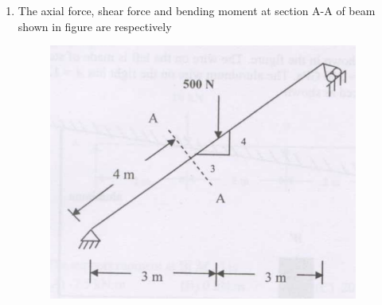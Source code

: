 \documentclass[12pt]{article}
\begin{document}
\begin{enumerate}
\begin{enumerate}

    \item  $F_{AB} = 12\ \mathrm{kN}(\mathrm{T}),\ F_{CD} = 12\ \mathrm{kN}(\mathrm{C}),\ F_{AD} = 9\ \mathrm{kN}(\mathrm{T}),\ F_{BC} = 9\ \mathrm{kN}(\mathrm{T}),\ F_{AC} = 0$  

    \item  $F_{BC} = 0,\ F_{AC} = 15\ \mathrm{kN}(\mathrm{T}),\ F_{CD} = 12\ \mathrm{kN}(\mathrm{C}),\ F_{AD} = 9\ \mathrm{kN}(\mathrm{T}),\ F_{AB} = 12\ \mathrm{kN}(\mathrm{T})$  

    \item  $F_{BC} = 0,\ F_{AC} = 15\ \mathrm{kN}(\mathrm{T}),\ F_{CD} = 12\ \mathrm{kN}(\mathrm{C}),\ F_{AB} = 12\ \mathrm{kN}(\mathrm{C})$  

    \item  $F_{AB} = F_{BC} = F_{AD} = 0,\ F_{AC} = 15\ \mathrm{kN}(\mathrm{T}),\ F_{CD} = 12\ \mathrm{kN}(\mathrm{C})$
\end{enumerate}    
    
    (GATE XE 2008)  

    \item The axial force, shear force and bending moment at section A-A of beam shown in figure are respectively  

    \begin{figure}[H]
    \centering
    \includegraphics[width=0.5\columnwidth]{figs/ass1_f_q25.png}
    \caption{}
    \end{figure}

\begin{enumerate}
\end{enumerate}
    

\end{enumerate}
\end{document}
